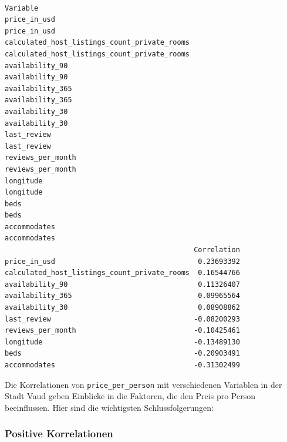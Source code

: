 \documentclass[
  journal,
]{IEEEtran}%
\begin{document}
\begin{verbatim}
                                                                                 Variable
price_in_usd                                                                 price_in_usd
calculated_host_listings_count_private_rooms calculated_host_listings_count_private_rooms
availability_90                                                           availability_90
availability_365                                                         availability_365
availability_30                                                           availability_30
last_review                                                                   last_review
reviews_per_month                                                       reviews_per_month
longitude                                                                       longitude
beds                                                                                 beds
accommodates                                                                 accommodates
                                             Correlation
price_in_usd                                  0.23693392
calculated_host_listings_count_private_rooms  0.16544766
availability_90                               0.11326407
availability_365                              0.09965564
availability_30                               0.08908862
last_review                                  -0.08200293
reviews_per_month                            -0.10425461
longitude                                    -0.13489130
beds                                         -0.20903491
accommodates                                 -0.31302499
\end{verbatim}

Die Korrelationen von \texttt{price\_per\_person} mit verschiedenen
Variablen in der Stadt Vaud geben Einblicke in die Faktoren, die den
Preis pro Person beeinflussen. Hier sind die wichtigsten
Schlussfolgerungen:

\subsubsection{Positive Korrelationen}\label{positive-korrelationen-1}
\end{document}
